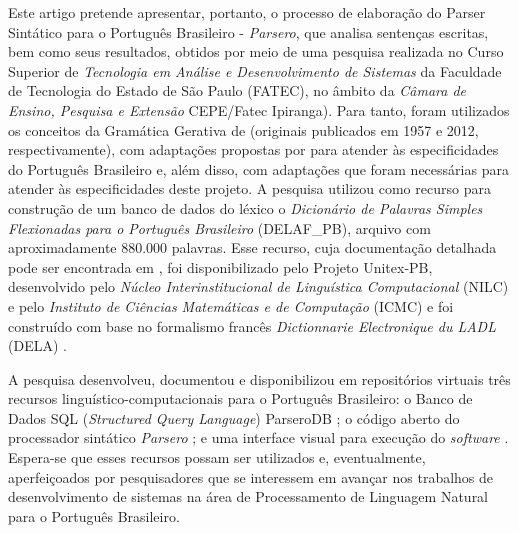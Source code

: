 \documentclass[portuguese]{textolivre}
\begin{document}
Este artigo pretende apresentar, portanto, o processo de elaboração do Parser Sintático para o Português Brasileiro - \textit{Parsero}, que analisa sentenças escritas, bem como seus resultados, obtidos por meio de uma pesquisa realizada no Curso Superior de \textit{Tecnologia em Análise e Desenvolvimento de Sistemas} da Faculdade de Tecnologia do Estado de São Paulo (FATEC), no âmbito da \textit{Câmara de Ensino, Pesquisa e Extensão} CEPE/Fatec Ipiranga). Para tanto, foram utilizados os conceitos da Gramática Gerativa de \textcite{chomsky__2014,chomsky_estruturas_2015} (originais publicados em 1957 e 2012, respectivamente), com adaptações propostas por \textcite{othero_gramatica_2009} para atender às especificidades do Português Brasileiro e, além disso, com adaptações que foram necessárias para atender às especificidades deste projeto. A pesquisa utilizou como recurso para construção de um banco de dados do léxico o \textit{Dicionário de Palavras Simples Flexionadas para o Português Brasileiro} (DELAF\_PB), arquivo com aproximadamente 880.000 palavras. Esse recurso, cuja documentação detalhada pode ser encontrada em \textcite{muniz_construcao_2004}, foi disponibilizado pelo Projeto Unitex-PB, desenvolvido pelo \textit{Núcleo Interinstitucional de Linguística Computacional} (NILC) e pelo \textit{Instituto de Ciências Matemáticas e de Computação} (ICMC) e foi construído com base no formalismo francês \textit{Dictionnarie Electronique du LADL} (DELA) \cite{muniz_construcao_2004}.  

A pesquisa desenvolveu, documentou e disponibilizou em repositórios virtuais três recursos linguístico-computacionais para o Português Brasileiro: o Banco de Dados SQL (\textit{Structured Query Language}) ParseroDB \cite{pacheco_banco_2021, pacheco_parser-api_2021}; o código aberto do processador sintático \textit{Parsero} \cite{pacheco_parser-api_2021}; e uma interface visual para execução do \textit{software} \cite{noauthor_parsero:_2021}. Espera-se que esses recursos possam ser utilizados e, eventualmente, aperfeiçoados por pesquisadores que se interessem em avançar nos trabalhos de desenvolvimento de sistemas na área de Processamento de Linguagem Natural para o Português Brasileiro. 
\end{document}
